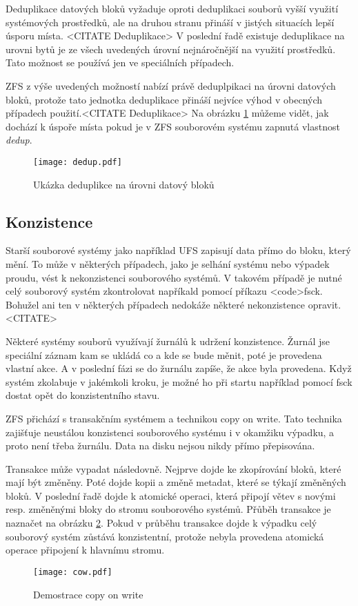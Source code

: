     Deduplikace datových bloků vyžaduje oproti deduplikaci souborů vyšší využití systémových prostředků, ale na druhou stranu přináší v jistých situacích lepší úsporu místa. <CITATE Deduplikace>
    V poslední řadě existuje deduplikace na urovni bytů je ze všech uvedených úrovní nejnáročnější na využití prostředků. Tato možnost se používá jen ve speciálních případech.

    ZFS z výše uvedených možností nabízí právě deduplpikaci na úrovni datových bloků, protože tato jednotka deduplikace přináší nejvíce výhod v obecných případech použití.<CITATE Deduplikace> Na obrázku \ref{blockdedup} můžeme vidět, jak dochází k úspoře místa pokud je v ZFS souborovém systému zapnutá vlastnost \emph{dedup}.
    \begin{figure}[!h]
        \caption{Ukázka deduplikce na úrovni datový bloků}
        \label{blockdedup}
        \texttt{[image: dedup.pdf]}
    \end{figure}
    \subsection{Konzistence}
    \label{consitence}
    Starší souborové systémy jako například UFS zapisují data přímo do bloku, který mění. To může v některých případech, jako je selhání systému nebo výpadek proudu, vést k nekonzistenci souborového systémů. V takovém případě je nutné celý souborový systém zkontrolovat napříkald pomocí příkazu <code>fsck. Bohužel ani ten v některých případech
    nedokáže některé nekonzistence opravit. <CITATE>

    Některé systémy souborů využívají žurnálů k udržení konzistence. Žurnál jse speciální záznam kam se ukládá co a kde se bude měnit, poté
    je provedena vlastní akce. A v poslední fázi se do žurnálu zapíše, že akce byla provedena. Když systém zkolabuje v jakémkoli kroku, je možné ho při startu například pomocí
    fsck dostat opět do konzistentního stavu.

    ZFS přichází s transakčním systémem a technikou copy on write. Tato technika zajišťuje neustálou konzistenci souborového systému i v okamžiku výpadku, a proto není třeba žurnálu. Data na disku nejsou nikdy přímo přepisována.

    Transakce může vypadat následovně. Nejprve dojde ke zkopírování bloků, které mají být změněny. Poté dojde kopii a změně metadat, které se týkají změněných bloků. V poslední
    řadě dojde k atomické operaci, která připojí větev s novými resp. změněnými bloky do stromu souborového systémů. Přůběh transakce je naznačet na obrázku \ref{cow}. Pokud v průběhu transakce dojde k výpadku celý souborový systém zůstává konzistentní, protože nebyla provedena atomická operace připojení k hlavnímu stromu.
    \begin{figure}[h]
        \caption{Demostrace copy on write}
        \label{cow}
        \texttt{[image: cow.pdf]}
    \end{figure}
